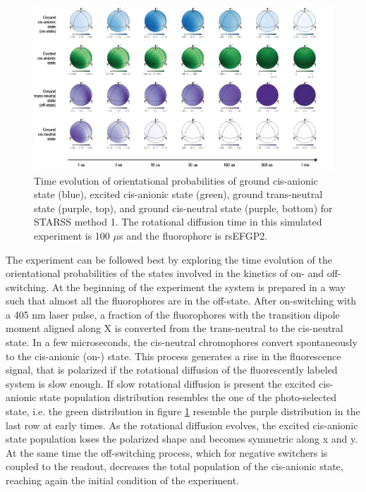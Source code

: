 \documentclass{article}
\begin{document}

\begin{figure}[h!]
    \centering
    \includegraphics[width=1\textwidth]
    {figures/starss1_spheres_time_axis.png}
    \caption[Time evolution of orientational probabilities for STARSS method 1]
    {Time evolution of orientational probabilities of ground cis-anionic state (blue), excited cis-anionic state (green), ground trans-neutral state (purple, top), and ground cis-neutral state (purple, bottom) for STARSS method 1. The rotational diffusion time in this simulated experiment is 100 $\mu$s and the fluorophore is rsEFGP2.}
    \label{fig:starss1_sphere_series}
\end{figure}

The experiment can be followed best by exploring the time evolution of the orientational probabilities of the states involved in the kinetics of on- and off-switching. At the beginning of the experiment the system is prepared in a way such that almost all the fluorophores are in the off-state. After on-switching with a 405 nm laser pulse, a fraction of the fluorophores with the transition dipole moment aligned along X is converted from the trans-neutral to the cis-neutral state. In a few microseconds, the cis-neutral chromophores convert spontaneously to the cis-anionic (on-) state. This process generates a rise in the fluorescence signal, that is polarized if the rotational diffusion of the fluorescently labeled system is slow enough. If slow rotational diffusion is present the excited cis-anionic state population distribution resembles the one of the photo-selected state, i.e. the green distribution in figure \ref{fig:starss1_sphere_series} resemble the purple distribution in the last row at early times. As the rotational diffusion evolves, the excited cis-anionic state population loses the polarized shape and becomes symmetric along x and y. At the same time the off-switching process, which for negative switchers is coupled to the readout, decreases the total population of the cis-anionic state, reaching again the initial condition of the experiment.
\clearpage
\end{document}
